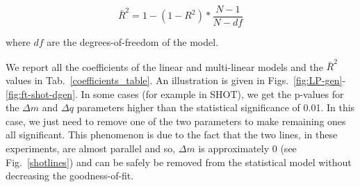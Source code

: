 \documentclass{article}
\begin{document}
\begin{equation}
    \bar{R}^2 = 1 - (1 - R^2) * \frac{N - 1}{N - df}
\end{equation}

where $df$ are the degrees-of-freedom of the model.

We report all the coefficients of the linear and multi-linear models and the $\bar{R}^2$ values in Tab.~\ref{coefficients_table}. An illustration is given in Figs.~\ref{fig:LP-gen}-\ref{fig:ft-shot-dgen}. In some cases (for example in SHOT), we get the p-values for the $\Delta m$ and $\Delta q$ parameters higher than the statistical significance of 0.01. In this case, we just need to remove one of the two parameters to make remaining ones all significant. This phenomenon is due to the fact that the two lines, in these experiments, are almost parallel and so, $\Delta m$ is approximately 0 (see Fig.~\ref{shotlines}) and can be safely be removed from the statistical model without decreasing the goodness-of-fit.
\end{document}
